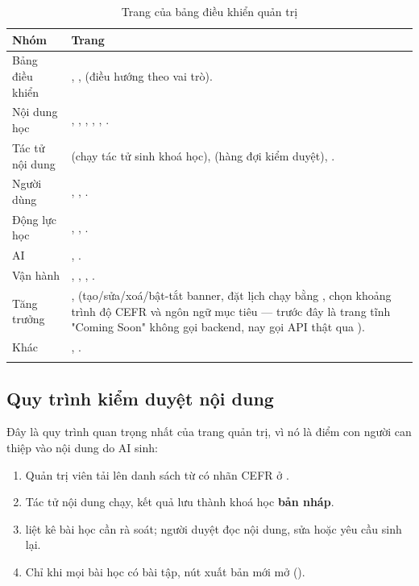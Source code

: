 \begin{longtable}{L{4.0cm} L{9.6cm}}
\toprule
\textbf{Nhóm} & \textbf{Trang}\\
\midrule
\endhead
Bảng điều khiển & , ,  (điều hướng theo vai trò).\\
Nội dung học & , , , , , .\\
Tác tử nội dung &  (chạy tác tử sinh khoá học),  (hàng đợi kiểm duyệt), .\\
Người dùng & , , .\\
Động lực học & , , .\\
AI & , .\\
Vận hành & , , , .\\
Tăng trưởng & , 
(tạo/sửa/xoá/bật-tắt banner, đặt lịch chạy bằng , chọn khoảng trình
độ CEFR và ngôn ngữ mục tiêu — trước đây là trang tĩnh "Coming Soon" không gọi backend,
nay gọi API  thật qua ).\\
Khác & , .\\
\bottomrule
\caption{Trang của bảng điều khiển quản trị}
\end{longtable}

\subsection{Quy trình kiểm duyệt nội dung}

Đây là quy trình quan trọng nhất của trang quản trị, vì nó là điểm con người can thiệp vào
nội dung do AI sinh:

\begin{enumerate}[leftmargin=1.4em]
  \item Quản trị viên tải lên danh sách từ có nhãn CEFR ở .
  \item Tác tử nội dung chạy, kết quả lưu thành khoá học \textbf{bản nháp}.
  \item {} liệt kê bài học cần rà soát; người duyệt đọc nội dung,
  sửa hoặc yêu cầu sinh lại.
  \item Chỉ khi mọi bài học có bài tập, nút xuất bản mới mở
  ().
\end{enumerate}

